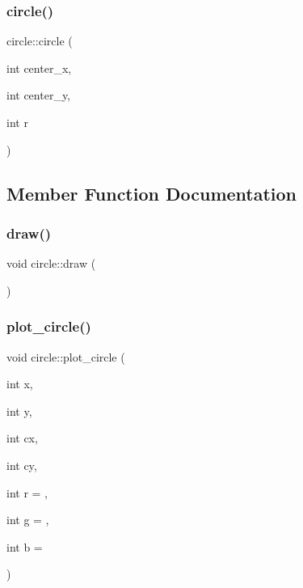 \subsubsection{\texorpdfstring{circle()}{circle()}}
{\footnotesize\ttfamily circle\+::circle (\begin{DoxyParamCaption}\item[{int}]{center\+\_\+x,  }\item[{int}]{center\+\_\+y,  }\item[{int}]{r }\end{DoxyParamCaption})}



\subsection{Member Function Documentation}
\mbox{\label{classcircle_ab64f82d19bb3a5318d1b94bf9946b732}} 
\subsubsection{\texorpdfstring{draw()}{draw()}}
{\footnotesize\ttfamily void circle\+::draw (\begin{DoxyParamCaption}{ }\end{DoxyParamCaption})}

\mbox{\label{classcircle_a2a17a7069348f990b854b7e6d7cef358}} 
\subsubsection{\texorpdfstring{plot\+\_\+circle()}{plot\_circle()}}
{\footnotesize\ttfamily void circle\+::plot\+\_\+circle (\begin{DoxyParamCaption}\item[{int}]{x,  }\item[{int}]{y,  }\item[{int}]{cx,  }\item[{int}]{cy,  }\item[{int}]{r = {},  }\item[{int}]{g = {},  }\item[{int}]{b = {} }\end{DoxyParamCaption})\hspace{0.3cm}{\ttfamily [private]}}



